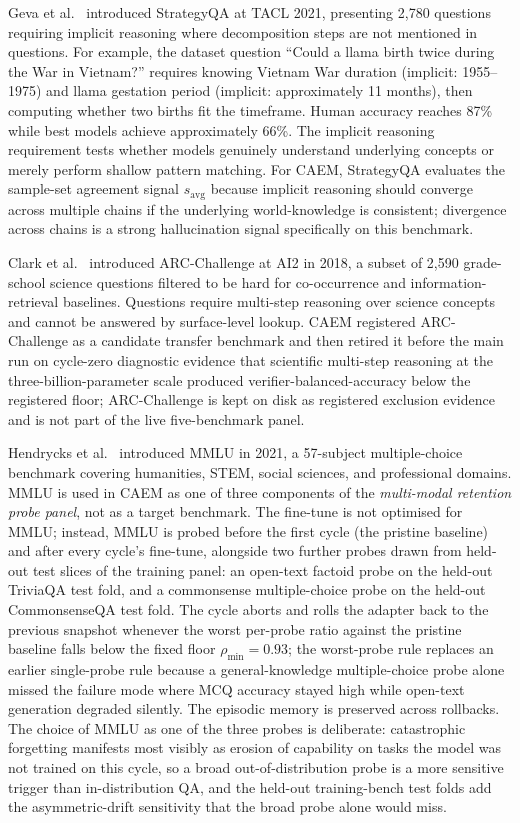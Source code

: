 Geva et al.~\cite{10.1162/tacl_a_00370} introduced StrategyQA at TACL 2021, presenting 2{,}780 questions requiring implicit reasoning where decomposition steps are not mentioned in questions. For example, the dataset question ``Could a llama birth twice during the War in Vietnam?'' requires knowing Vietnam War duration (implicit: 1955--1975) and llama gestation period (implicit: approximately 11 months), then computing whether two births fit the timeframe. Human accuracy reaches 87\% while best models achieve approximately 66\%. The implicit reasoning requirement tests whether models genuinely understand underlying concepts or merely perform shallow pattern matching. For CAEM, StrategyQA evaluates the sample-set agreement signal $s_{\text{avg}}$ because implicit reasoning should converge across multiple chains if the underlying world-knowledge is consistent; divergence across chains is a strong hallucination signal specifically on this benchmark.

Clark et al.~\cite{clark2018think} introduced ARC-Challenge at AI2 in 2018, a subset of 2{,}590 grade-school science questions filtered to be hard for co-occurrence and information-retrieval baselines. Questions require multi-step reasoning over science concepts and cannot be answered by surface-level lookup. CAEM registered ARC-Challenge as a candidate transfer benchmark and then retired it before the main run on cycle-zero diagnostic evidence that scientific multi-step reasoning at the three-billion-parameter scale produced verifier-balanced-accuracy below the registered floor; ARC-Challenge is kept on disk as registered exclusion evidence and is not part of the live five-benchmark panel.

Hendrycks et al.~\cite{hendrycks2021measuring} introduced MMLU in 2021, a 57-subject multiple-choice benchmark covering humanities, STEM, social sciences, and professional domains. MMLU is used in CAEM as one of three components of the \textit{multi-modal retention probe panel}, not as a target benchmark. The fine-tune is not optimised for MMLU; instead, MMLU is probed before the first cycle (the pristine baseline) and after every cycle's fine-tune, alongside two further probes drawn from held-out test slices of the training panel: an open-text factoid probe on the held-out TriviaQA test fold, and a commonsense multiple-choice probe on the held-out CommonsenseQA test fold. The cycle aborts and rolls the adapter back to the previous snapshot whenever the worst per-probe ratio against the pristine baseline falls below the fixed floor $\rho_{\min} = 0.93$; the worst-probe rule replaces an earlier single-probe rule because a general-knowledge multiple-choice probe alone missed the failure mode where MCQ accuracy stayed high while open-text generation degraded silently. The episodic memory is preserved across rollbacks. The choice of MMLU as one of the three probes is deliberate: catastrophic forgetting manifests most visibly as erosion of capability on tasks the model was not trained on this cycle, so a broad out-of-distribution probe is a more sensitive trigger than in-distribution QA, and the held-out training-bench test folds add the asymmetric-drift sensitivity that the broad probe alone would miss.

